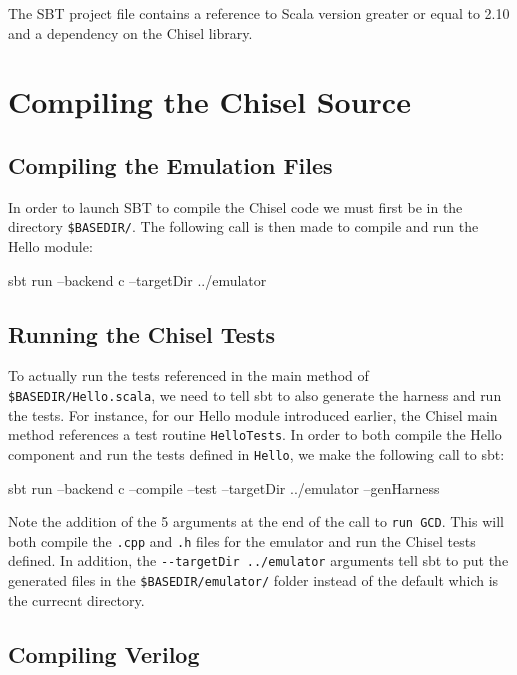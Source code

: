 \documentclass[twocolumn, 10pt]{article}
\begin{document}
The SBT project file contains a reference to Scala version greater or equal to 2.10 and a dependency on the Chisel library.

\section{Compiling the Chisel Source}

\subsection{Compiling the Emulation Files}

In order to launch SBT to compile the Chisel code we must first be in the directory \verb+$BASEDIR/+. The following call is then made to compile and run the Hello module:

\begin{bash}
sbt run --backend c --targetDir ../emulator 
\end{bash}

\subsection{Running the Chisel Tests}

To actually run the tests referenced in the main method of \verb+$BASEDIR/Hello.scala+, we need to tell sbt to also generate the harness and run the tests. For instance, for our Hello module introduced earlier, the Chisel main method references a test routine \verb+HelloTests+. In order to both compile the Hello component and run the tests defined in \verb+Hello+, we make the following call to sbt:

\begin{bash}
sbt run --backend c --compile --test --targetDir ../emulator --genHarness
\end{bash}

Note the addition of the 5 arguments at the end of the call to \verb+run GCD+. This will both compile the \verb+.cpp+ and \verb+.h+ files for the emulator and run the Chisel tests defined. In addition, the \verb+--targetDir ../emulator+ arguments tell sbt to put the generated files in the \verb+$BASEDIR/emulator/+ folder instead of the default which is the currecnt directory.

\subsection{Compiling Verilog}
\end{document}
